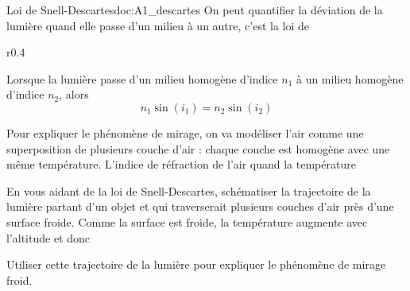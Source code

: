 \begin{doc}{Loi de Snell-Descartes}{doc:A1_descartes}
  On peut quantifier la déviation de la lumière quand elle passe d'un milieu à un autre, c'est la loi de 

  \vspace*{-16pt}
  \begin{wrapfigure}{r}{0.4\linewidth}
    \centering
  \end{wrapfigure}
  \phantom{b}
  \begin{importants}
    Lorsque la lumière passe d'un milieu homogène d'indice $n_1$ à un milieu homogène d'indice $n_2$, alors
    \begin{equation*}
      n_1 \sin(i_1) = n_2 \sin(i_2)
    \end{equation*}
  \end{importants}
  \phantom{b}
\end{doc}

\mesure
Pour expliquer le phénomène de mirage, on va modéliser l'air comme une superposition de plusieurs couche d'air : chaque couche est homogène avec une même température.
L'indice de réfraction de l'air  quand la température 

En vous aidant de la loi de Snell-Descartes, schématiser la trajectoire de la lumière partant d'un objet et qui traverserait plusieurs couches d'air près d'une surface froide.
Comme la surface est froide, la température augmente avec l'altitude et donc 

\mesure 
Utiliser cette trajectoire de la lumière pour expliquer le phénomène de mirage froid.
